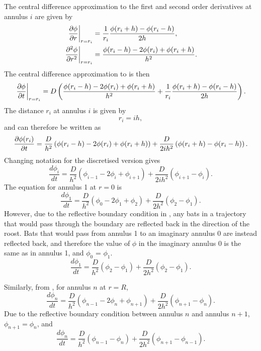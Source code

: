 The central difference approximation to the first and second order derivatives at annulus $i$ are given by
%
\begin{align}
 \left.\frac{\partial \phi}{\partial r}\right|_{r=r_i}&= \frac{1}{r_i}\frac{\phi(r_i+h)-\phi(r_i-h)}{2h}, \\
 \left.\frac{\partial^2 \phi}{\partial r^2}\right|_{r=r_i}&= \frac{\phi(r_i-h)-2\phi(r_i)+\phi(r_i+h)}{h^2}. \label{eqn:diffusion_discretei}
\end{align}
%
The central difference approximation to  is then
%
\begin{equation}
 \left.\frac{\partial \phi}{\partial t}\right|_{r=r_i} = D \left(\frac{\phi(r_i-h)-2\phi(r_i)+\phi(r_i+h)}{h^2} + \frac{1}{r_i} \frac{\phi(r_i+h)-\phi(r_i-h)}{2 h} \right).
 \label{eqn:diffusion_polar_cd}
\end{equation}
%
The distance $r_i$ at annulus $i$ is given by
\begin{equation}
r_i = i h ,
\end{equation}
%
and  can therefore be written as
%
\begin{equation}
\frac{\partial \phi(r_i)}{\partial t} = \frac{D}{h^2} \left(\phi(r_i-h)-2\phi(r_i)+\phi(r_i+h)\right) + \frac{D}{2ih^2}\left(\phi(r_i+h)-\phi(r_i-h) \right).
\label{eqn:diffusion_polar_final}
\end{equation}
%
Changing notation for the discretised version gives
%
\begin{equation}
\frac{d\phi_i}{dt} = \frac{D}{h^2}(\phi_{i-1}-2\phi_i +\phi_{i+1}) + \frac{D}{2ih^2} (\phi_{i+1}-\phi_{i}).
        \label{eqn:discrete_diffusion_i}
\end{equation}
%
The equation for annulus 1 at $r=0$ is
%
\begin{equation}
\frac{d\phi_1}{dt} = \frac{D}{h^2}(\phi_{0}-2\phi_1 +\phi_{2}) + \frac{D}{2h^2} (\phi_{2}-\phi_{1}).
\end{equation}
%
However, due to the reflective boundary condition in , any bats in a trajectory that would pass through the boundary are reflected back in the direction of the roost. Bats that would pass from annulus 1 to an imaginary annulus 0 are instead reflected back, and therefore the value of $\phi$ in the imaginary annulus 0 is the same as in annulus 1, and $\phi_0$ = $\phi_1$.
%
\begin{equation}
\frac{d\phi_1}{dt} = \frac{D}{h^2}(\phi_{2}- \phi_1) + \frac{D}{2h^2} (\phi_{2}-\phi_{1}) .
        \label{eqn:annulus_1}
\end{equation}

Similarly, from , for annulus $n$ at $r=R$,
%
\begin{equation}
\frac{d\phi_n}{dt} = \frac{D}{h^2}(\phi_{n-1}-2\phi_n +\phi_{n+1}) + \frac{D}{2h^2} (\phi_{n+1}-\phi_{n}) .
\end{equation}
%
Due to the reflective boundary condition between annulus $n$ and annulus $n+1$, $\phi_{n+1} = \phi_n$, and
\begin{equation}
\frac{d\phi_n}{dt} = \frac{D}{h^2}(\phi_{n-1}-\phi_n) + \frac{D}{2h^2} (\phi_{n+1}-\phi_{n-1}) .
        \label{eqn:annulus_n}
\end{equation}


